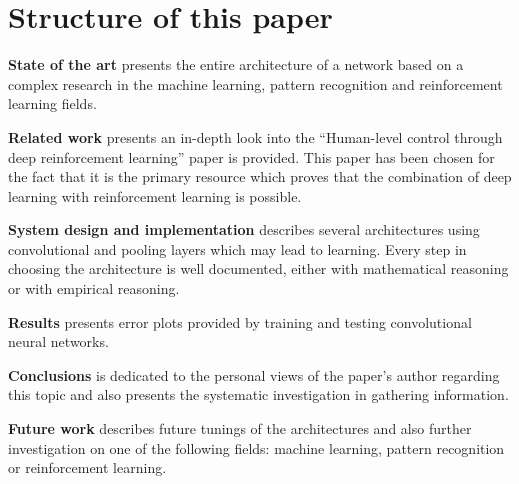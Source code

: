 \section{Structure of this paper}
\label{sec:paper_structure}

 \textbf{State of the art} presents the entire architecture of a network based on a complex research in the machine learning, pattern recognition and reinforcement learning fields.

 \textbf{Related work} presents an in-depth look into the ``Human-level control through deep reinforcement learning'' paper is provided. This paper has been chosen for the fact that it is the primary resource which proves that the combination of deep learning with reinforcement learning is possible. 

 \textbf{System design and implementation} describes several architectures using convolutional and pooling layers which may lead to learning. Every step in choosing the architecture is well documented, either with mathematical reasoning or with empirical reasoning.

 \textbf{Results} presents error plots provided by training and testing convolutional neural networks.

 \textbf{Conclusions} is dedicated to the personal views of the paper's author regarding this topic and also presents the systematic investigation in gathering information.

 \textbf{Future work} describes future tunings of the architectures and also further investigation on one of the following fields: machine learning, pattern recognition or reinforcement learning.







